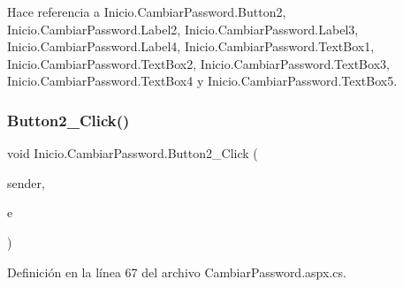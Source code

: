 \begin{DoxyCode}{0}

\end{DoxyCode}


Hace referencia a Inicio.\+Cambiar\+Password.\+Button2, Inicio.\+Cambiar\+Password.\+Label2, Inicio.\+Cambiar\+Password.\+Label3, Inicio.\+Cambiar\+Password.\+Label4, Inicio.\+Cambiar\+Password.\+Text\+Box1, Inicio.\+Cambiar\+Password.\+Text\+Box2, Inicio.\+Cambiar\+Password.\+Text\+Box3, Inicio.\+Cambiar\+Password.\+Text\+Box4 y Inicio.\+Cambiar\+Password.\+Text\+Box5.

\mbox{\label{classInicio_1_1CambiarPassword_aec4c171949c854275a9dd38e949cb62e}} 
\subsubsection{\texorpdfstring{Button2\_Click()}{Button2\_Click()}}
{\footnotesize\ttfamily void Inicio.\+Cambiar\+Password.\+Button2\+\_\+\+Click (\begin{DoxyParamCaption}\item[{object}]{sender,  }\item[{Event\+Args}]{e }\end{DoxyParamCaption})\hspace{0.3cm}{\ttfamily [protected]}}



Definición en la línea 67 del archivo Cambiar\+Password.\+aspx.\+cs.


